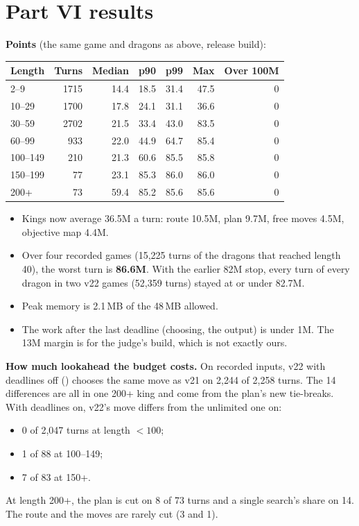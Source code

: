 \documentclass[11pt,a4paper]{article}
\newcommand{\code}[1]{\texttt{\detokenize{#1}}}
\begin{document}
\section{Part VI results}
\textbf{Points} (the same game and dragons as above, release build):
\begin{center}
\begin{tabular}{@{}lrrrrrr@{}}
\toprule
Length & Turns & Median & p90 & p99 & Max & Over 100M \\
\midrule
2--9 & 1715 & 14.4 & 18.5 & 31.4 & 47.5 & 0 \\
10--29 & 1700 & 17.8 & 24.1 & 31.1 & 36.6 & 0 \\
30--59 & 2702 & 21.5 & 33.4 & 43.0 & 83.5 & 0 \\
60--99 & 933 & 22.0 & 44.9 & 64.7 & 85.4 & 0 \\
100--149 & 210 & 21.3 & 60.6 & 85.5 & 85.8 & 0 \\
150--199 & 77 & 23.1 & 85.3 & 86.0 & 86.0 & 0 \\
200+ & 73 & 59.4 & 85.2 & 85.6 & 85.6 & 0 \\
\bottomrule
\end{tabular}
\end{center}
\begin{itemize}
  \item Kings now average 36.5M a turn: route 10.5M, plan 9.7M, free moves 4.5M, objective map 4.4M.
  \item Over four recorded games (15,225 turns of the dragons that reached length 40), the worst turn is \textbf{86.6M}.
        With the earlier 82M stop, every turn of every dragon in two v22 games (52,359 turns) stayed at or under 82.7M.
  \item Peak memory is 2.1\,MB of the 48\,MB allowed.
  \item The work after the last deadline (choosing, the output) is under 1M. The 13M margin is for the judge's build, which
        is not exactly ours.
\end{itemize}

\textbf{How much lookahead the budget costs.} On recorded inputs, v22 with deadlines off (\code{BOT_UNLIMITED}) chooses
the same move as v21 on 2,244 of 2,258 turns. The 14 differences are all in one 200+ king and come from the plan's new
tie-breaks. With deadlines on, v22's move differs from the unlimited one on:
\begin{itemize}
  \item 0 of 2,047 turns at length $<100$;
  \item 1 of 88 at 100--149;
  \item 7 of 83 at 150+.
\end{itemize}
At length 200+, the plan is cut on 8 of 73 turns and a single search's share on 14. The route and the moves are rarely cut
(3 and 1).
\end{document}
